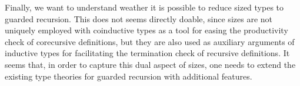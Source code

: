 \documentclass[a4paper,UKenglish,cleveref, autoref,numberwithinsect]{lipics-v2019}
\begin{document}
Finally, we want to understand weather it is possible to reduce sized
types to guarded recursion.  This does not seems directly doable,
since sizes are not uniquely employed with coinductive types as a tool
for easing the productivity check of corecursive definitions, but they
are also used as auxiliary arguments of inductive types for
facilitating the termination check of recursive definitions. It seems
that, in order to capture this dual aspect of sizes, one needs to
extend the existing type theories for guarded recursion with
additional features.



\end{document}
